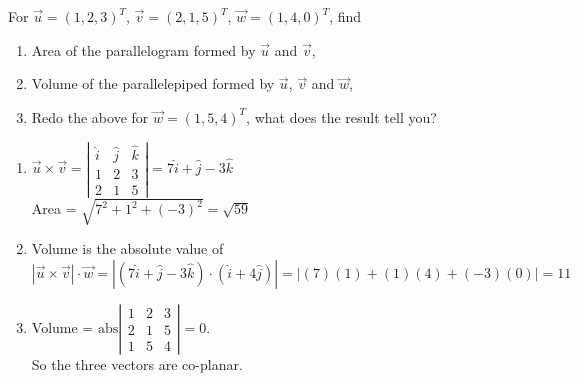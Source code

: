 \begin{Exercise}
For $\vec{u} = (1,2,3)^T$, $\vec{v} = (2,1,5)^T$, $\vec{w} = (1,4,0)^T$, find
\begin{enumerate}[label=(\alph*)]
\item Area of the parallelogram formed by $\vec{u}$ and $\vec{v}$,
\item Volume of the parallelepiped formed by $\vec{u}$, $\vec{v}$ and $\vec{w}$,
\item Redo the above for $\vec{w} = (1,5,4)^T$, what does the result tell you?
\end{enumerate}
\end{Exercise}
\begin{Answer}
\begin{enumerate}[label=(\alph*)]
\item $\vec{u} \times \vec{v} =
\left|
\begin{array}{ccc}
\hat{i} & \hat{j} & \hat{k}\\
1 & 2 & 3\\
2 & 1 & 5
\end{array}
\right|
=
7\hat{i} + \hat{j} - 3\hat{k}$\\
Area = $\sqrt{7^2 + 1^2 + (-3)^2} = \sqrt{59}$
\item Volume is the absolute value of $|\vec{u} \times \vec{v}| \cdot \vec{w} 
= |(7\hat{i} + \hat{j} - 3\hat{k}) \cdot (\hat{i} + 4\hat{j})| = |(7)(1) + (1)(4) + (-3)(0)| = 11$
\item Volume = $\text{abs}\left|
\begin{array}{ccc}
1 & 2 & 3\\
2 & 1 & 5\\
1 & 5 & 4
\end{array}
\right|
= 0$. \\
So the three vectors are co-planar.
\end{enumerate}
\end{Answer}

